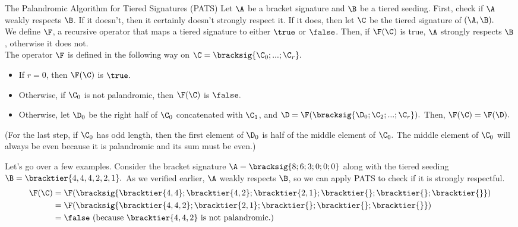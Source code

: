 {    \begin{definition}{The Palandromic Algorithm for Tiered Signatures (PATS)}{}
        Let $\A$ be a bracket signature and $\B$ be a tiered seeding. First, check if $\A$ weakly respects $\B$. If it doesn't, then it certainly doesn't strongly respect it. If it does, then let $\C$ be the tiered signature of $(\A, \B).$\\

        We define $\F$, a recursive operator that maps a tiered signature to either $\true$ or $\false$. Then, if $\F(\C)$ is true, $\A$ strongly respects $\B$, otherwise it does not.\\

        The operator $\F$ is defined in the following way on $\C = \bracksig{\C_{0}; ...; \C_{r}}.$
        \begin{itemize}
            \item If $r = 0$, then $\F(\C)$ is $\true.$
            \item Otherwise, if $\C_0$ is not palandromic, then $\F(\C)$ is $\false.$
            \item Otherwise, let $\D_0$ be the right half of $\C_0$ concatenated with $\C_1$, and $\D = \F(\bracksig{\D_0; \C_2; ...; \C_{r}}).$ Then, $\F(\C) = \F(\D).$
        \end{itemize} 

        (For the last step, if $\C_0$ has odd length, then the first element of $\D_0$ is half of the middle element of $\C_0.$ The middle element of $\C_0$ will always be even because it is palandromic and its sum must be even.)
    \end{definition}

    Let's go over a few examples. Consider the bracket signature $\A = \bracksig{8;6;3;0;0;0}$ along with the tiered seeding $\B = \bracktier{4,4,4,2,2,1}.$ As we verified earlier, $\A$ weakly respects $\B$, so we can apply PATS to check if it is strongly respectful.
    \begin{align*}
        \F(\C) &= \F(\bracksig{\bracktier{4, 4};\bracktier{4,2};\bracktier{2,1};\bracktier{};\bracktier{};\bracktier{}})\\
        &= \F(\bracksig{\bracktier{4, 4,2};\bracktier{2,1};\bracktier{};\bracktier{};\bracktier{}})\\
        &= \false \textrm{ (because $\bracktier{4, 4, 2}$ is not palandromic.)}
    \end{align*}


}
